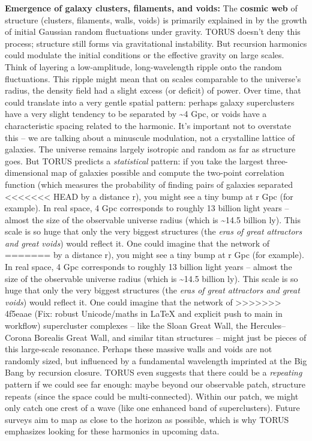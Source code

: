 \documentclass[]{article}
\begin{document}
\textbf{Emergence of galaxy clusters, filaments, and voids:} The
\textbf{cosmic web} of structure (clusters, filaments, walls, voids) is
primarily explained in  by the growth of initial Gaussian random
fluctuations under gravity. TORUS doesn't deny this process; structure
still forms via gravitational instability. But recursion harmonics could
modulate the initial conditions or the effective gravity on large
scales. Think of layering a low-amplitude, long-wavelength ripple onto
the random fluctuations. This ripple might mean that on scales
comparable to the universe's radius, the density field had a slight
excess (or deficit) of power. Over time, that could translate into a
very gentle spatial pattern: perhaps galaxy superclusters have a very
slight tendency to be separated by \textasciitilde{}4 Gpc, or voids have
a characteristic spacing related to the harmonic. It's important not to
overstate this -- we are talking about a minuscule modulation, not a
crystalline lattice of galaxies. The universe remains largely isotropic
and random as far as structure goes. But TORUS predicts a
\emph{statistical} pattern: if you take the largest three-dimensional
map of galaxies possible and compute the two-point correlation function
(which measures the probability of finding pairs of galaxies separated
<<<<<<< HEAD
by a distance r), you might see a tiny bump at r  Gpc (for
example)\hspace{0pt}. In real space, 4 Gpc corresponds to roughly 13
billion light years -- almost the size of the observable universe radius
(which is \textasciitilde14.5 billion ly). This scale is so huge that
only the very biggest structures (the \emph{eras of great attractors and
great voids}) would reflect it. One could imagine that the network of
=======
by a distance r), you might see a tiny bump at r  Gpc (for example)​.
In real space, 4 Gpc corresponds to roughly 13 billion light years --
almost the size of the observable universe radius (which is
\textasciitilde{}14.5 billion ly). This scale is so huge that only the
very biggest structures (the \emph{eras of great attractors and great
voids}) would reflect it. One could imagine that the network of
>>>>>>> 4f5eaae (Fix: robust Unicode/maths in LaTeX and explicit push to main in workflow)
supercluster complexes -- like the Sloan Great Wall, the
Hercules--Corona Borealis Great Wall, and similar titan structures --
might just be pieces of this large-scale resonance. Perhaps these
massive walls and voids are not randomly sized, but influenced by a
fundamental wavelength imprinted at the Big Bang by recursion closure.
TORUS even suggests that there could be a \emph{repeating} pattern if we
could see far enough: maybe beyond our observable patch, structure
repeats (since the space could be multi-connected). Within our patch, we
might only catch one crest of a wave (like one enhanced band of
superclusters). Future surveys aim to map as close to the horizon as
possible, which is why TORUS emphasizes looking for these harmonics in
upcoming data​.
\end{document}
